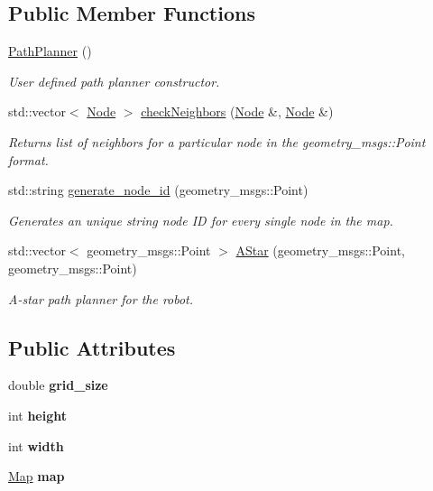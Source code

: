 \subsection*{Public Member Functions}
\begin{DoxyCompactItemize}
\item 
\hyperlink{class_path_planner_a376f30d795cfe0a40f8923f49336f7da}{Path\+Planner} ()
\begin{DoxyCompactList}\small\item\em User defined path planner constructor. \end{DoxyCompactList}\item 
std\+::vector$<$ \hyperlink{class_node}{Node} $>$ \hyperlink{class_path_planner_a1987b46d8737e5e7b9870949218fddc9}{check\+Neighbors} (\hyperlink{class_node}{Node} \&, \hyperlink{class_node}{Node} \&)
\begin{DoxyCompactList}\small\item\em Returns list of neighbors for a particular node in the geometry\+\_\+msgs\+::\+Point format. \end{DoxyCompactList}\item 
std\+::string \hyperlink{class_path_planner_acb53cf920151b166efd9f28cf10d137c}{generate\+\_\+node\+\_\+id} (geometry\+\_\+msgs\+::\+Point)
\begin{DoxyCompactList}\small\item\em Generates an unique string node ID for every single node in the map. \end{DoxyCompactList}\item 
std\+::vector$<$ geometry\+\_\+msgs\+::\+Point $>$ \hyperlink{class_path_planner_abc06e42be6f237be6c5028143d7d9ba0}{A\+Star} (geometry\+\_\+msgs\+::\+Point, geometry\+\_\+msgs\+::\+Point)
\begin{DoxyCompactList}\small\item\em A-\/star path planner for the robot. \end{DoxyCompactList}\end{DoxyCompactItemize}
\subsection*{Public Attributes}
\begin{DoxyCompactItemize}
\item 
\mbox{\label{class_path_planner_a1374000170205c0174b00b36fd34b024}} 
double {\bfseries grid\+\_\+size}
\item 
\mbox{\label{class_path_planner_a05f76d94f8bd13bb96c1dbeb48ff5b15}} 
int {\bfseries height}
\item 
\mbox{\label{class_path_planner_a2c46726f5a24852c20ce0494dd61389a}} 
int {\bfseries width}
\item 
\mbox{\label{class_path_planner_ace91a3df3576ab8eadcb8358673e7953}} 
\hyperlink{class_map}{Map} {\bfseries map}
\end{DoxyCompactItemize}


